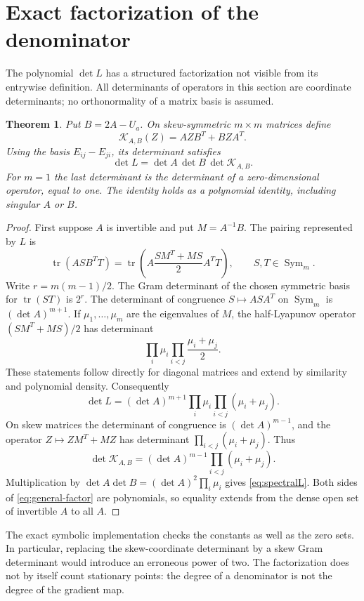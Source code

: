 \documentclass[11pt]{article}
\newtheorem{theorem}{Theorem}[section]
\theoremstyle{remark}\newtheorem{remark}[theorem]{Remark}
\DeclareMathOperator{\tr}{tr}
\DeclareMathOperator{\Sym}{Sym}
\begin{document}
\section{Exact factorization of the denominator}\label{sec:denominator}
The polynomial $\det L$ has a structured factorization not visible from its entrywise definition. All determinants of operators in this section are coordinate determinants; no orthonormality of a matrix basis is assumed.

\begin{theorem}\label{thm:factor}
Put $B=2A-U_a$. On skew-symmetric $m\times m$ matrices define
\[
\mathcal K_{A,B}(Z)=AZB^T+BZA^T.
\]
Using the basis $E_{ij}-E_{ji}$, its determinant satisfies
\begin{equation}\label{eq:general-factor}
\boxed{\det L=\det A\,\det B\,\det\mathcal K_{A,B}.}
\end{equation}
For $m=1$ the last determinant is the determinant of a zero-dimensional operator, equal to one. The identity holds as a polynomial identity, including singular $A$ or $B$.
\end{theorem}
\begin{proof}
First suppose $A$ is invertible and put $M=A^{-1}B$. The pairing represented by $L$ is
\[
\tr(A S B^T T)=\tr\left(A\frac{SM^T+MS}{2}A^T T\right),\qquad S,T\in\Sym_m.
\]
Write $r=m(m-1)/2$. The Gram determinant of the chosen symmetric basis for $\tr(ST)$ is $2^r$. The determinant of congruence $S\mapsto ASA^T$ on $\Sym_m$ is $(\det A)^{m+1}$. If $\mu_1,\dots,\mu_m$ are the eigenvalues of $M$, the half-Lyapunov operator $(SM^T+MS)/2$ has determinant
\[
\prod_i\mu_i\prod_{i<j}\frac{\mu_i+\mu_j}{2}.
\]
These statements follow directly for diagonal matrices and extend by similarity and polynomial density. Consequently
\begin{equation}\label{eq:spectralL}
\det L=(\det A)^{m+1}\prod_i\mu_i\prod_{i<j}(\mu_i+\mu_j).
\end{equation}
On skew matrices the determinant of congruence is $(\det A)^{m-1}$, and the operator $Z\mapsto ZM^T+MZ$ has determinant $\prod_{i<j}(\mu_i+\mu_j)$. Thus
\[
\det\mathcal K_{A,B}=(\det A)^{m-1}\prod_{i<j}(\mu_i+\mu_j).
\]
Multiplication by $\det A\det B=(\det A)^2\prod_i\mu_i$ gives \eqref{eq:spectralL}. Both sides of \eqref{eq:general-factor} are polynomials, so equality extends from the dense open set of invertible $A$ to all $A$.
\end{proof}

The exact symbolic implementation checks the constants as well as the zero sets. In particular, replacing the skew-coordinate determinant by a skew Gram determinant would introduce an erroneous power of two. The factorization does not by itself count stationary points: the degree of a denominator is not the degree of the gradient map.
\end{document}
